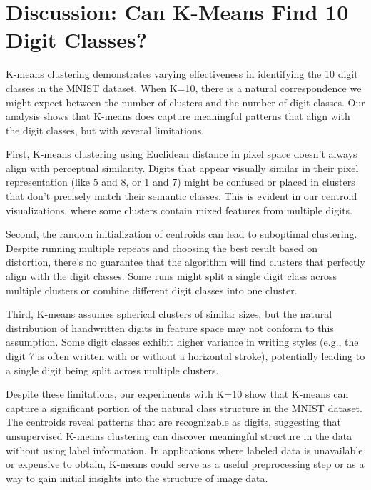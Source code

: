 \documentclass{article}
\begin{document}
\section{Discussion: Can K-Means Find 10 Digit Classes?}
\noindent
K-means clustering demonstrates varying effectiveness in identifying the 10 digit classes in the MNIST dataset. When K=10, there is a natural correspondence we might expect between the number of clusters and the number of digit classes. Our analysis shows that K-means does capture meaningful patterns that align with the digit classes, but with several limitations.

First, K-means clustering using Euclidean distance in pixel space doesn't always align with perceptual similarity. Digits that appear visually similar in their pixel representation (like 5 and 8, or 1 and 7) might be confused or placed in clusters that don't precisely match their semantic classes. This is evident in our centroid visualizations, where some clusters contain mixed features from multiple digits.

Second, the random initialization of centroids can lead to suboptimal clustering. Despite running multiple repeats and choosing the best result based on distortion, there's no guarantee that the algorithm will find clusters that perfectly align with the digit classes. Some runs might split a single digit class across multiple clusters or combine different digit classes into one cluster.

Third, K-means assumes spherical clusters of similar sizes, but the natural distribution of handwritten digits in feature space may not conform to this assumption. Some digit classes exhibit higher variance in writing styles (e.g., the digit 7 is often written with or without a horizontal stroke), potentially leading to a single digit being split across multiple clusters.

Despite these limitations, our experiments with K=10 show that K-means can capture a significant portion of the natural class structure in the MNIST dataset. The centroids reveal patterns that are recognizable as digits, suggesting that unsupervised K-means clustering can discover meaningful structure in the data without using label information. In applications where labeled data is unavailable or expensive to obtain, K-means could serve as a useful preprocessing step or as a way to gain initial insights into the structure of image data.
\end{document}
